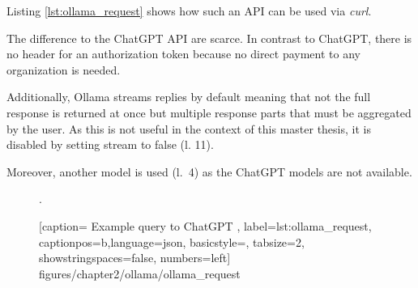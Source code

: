 Listing \ref{lst:ollama_request} shows how such an \ac{API} can be used via \textit{curl}.

The difference to the ChatGPT \ac{API} are scarce. In contrast to ChatGPT, there is no header for an authorization token because no direct payment to any organization is needed. 

Additionally, Ollama streams replies by default meaning that not the full response is returned at once but multiple response parts that must be aggregated by the user. As this is not useful in the context of this master thesis, it is disabled by setting stream to false (l. 11).

Moreover, another model is used (l.~4) as the ChatGPT models are not available. 


 \begin{figure} [htbp!]. 
			
			[caption={ Example query to ChatGPT  \cite{ChatGPT_url}},
			label={lst:ollama_request},
			captionpos=b,language=json, basicstyle=\footnotesize, tabsize=2, showstringspaces=false,  numbers=left]
			{figures/chapter2/ollama/ollama_request}
		\end{figure}